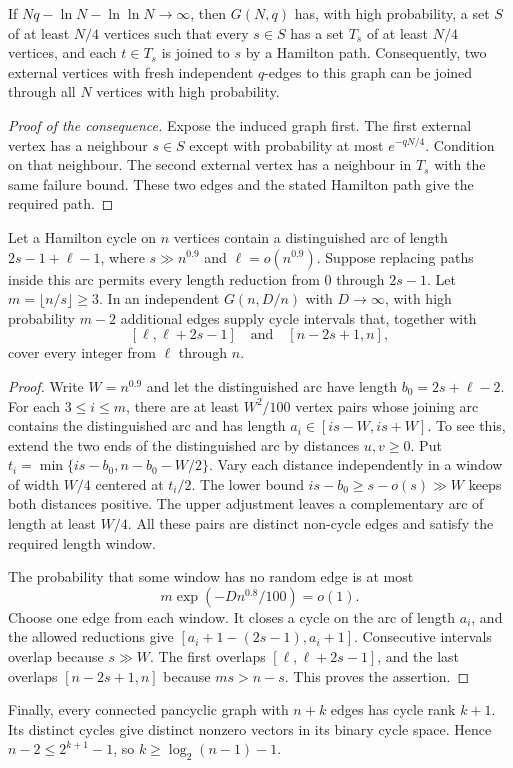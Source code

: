 \begin{lemma}\label{lem:rhost-threshold-hamilton}
If $Nq-\ln N-\ln\ln N\to\infty$, then $G(N,q)$ has, with high probability,
a set $S$ of at least $N/4$ vertices such that every $s\in S$ has a set $T_s$ of at least $N/4$ vertices,
and each $t\in T_s$ is joined to $s$ by a Hamilton path.
Consequently, two external vertices with fresh independent $q$-edges to this graph can be joined through all $N$ vertices with high probability.
\end{lemma}

\begin{proof}[Proof of the consequence]
Expose the induced graph first.
The first external vertex has a neighbour $s\in S$ except with probability at most $e^{-qN/4}$.
Condition on that neighbour.
The second external vertex has a neighbour in $T_s$ with the same failure bound.
These two edges and the stated Hamilton path give the required path.
\end{proof}

\begin{lemma}\label{lem:rhost-threshold-windows}
Let a Hamilton cycle on $n$ vertices contain a distinguished arc of length
$2s-1+\ell-1$, where $s\gg n^{0.9}$ and $\ell=o(n^{0.9})$.
Suppose replacing paths inside this arc permits every length reduction from $0$ through $2s-1$.
Let $m=\lfloor n/s\rfloor\ge3$.
In an independent $G(n,D/n)$ with $D\to\infty$, with high probability $m-2$ additional edges
supply cycle intervals that, together with
\[
 [\ell,\ell+2s-1]\quad\text{and}\quad[n-2s+1,n],
\]
cover every integer from $\ell$ through $n$.
\end{lemma}

\begin{proof}
Write $W=n^{0.9}$ and let the distinguished arc have length $b_0=2s+\ell-2$.
For each $3\le i\le m$, there are at least $W^2/100$ vertex pairs whose joining arc contains the distinguished arc
and has length $a_i\in[is-W,is+W]$.
To see this, extend the two ends of the distinguished arc by distances $u,v\ge0$.
Put $t_i=\min\{is-b_0,n-b_0-W/2\}$.
Vary each distance independently in a window of width $W/4$ centered at $t_i/2$.
The lower bound $is-b_0\ge s-o(s)\gg W$ keeps both distances positive.
The upper adjustment leaves a complementary arc of length at least $W/4$.
All these pairs are distinct non-cycle edges and satisfy the required length window.

The probability that some window has no random edge is at most
\[
 m\exp(-Dn^{0.8}/100)=o(1).
\]
Choose one edge from each window.
It closes a cycle on the arc of length $a_i$, and the allowed reductions give
$[a_i+1-(2s-1),a_i+1]$.
Consecutive intervals overlap because $s\gg W$.
The first overlaps $[\ell,\ell+2s-1]$, and the last overlaps $[n-2s+1,n]$ because $ms>n-s$.
This proves the assertion.
\end{proof}

Finally, every connected pancyclic graph with $n+k$ edges has cycle rank $k+1$.
Its distinct cycles give distinct nonzero vectors in its binary cycle space.
Hence $n-2\le2^{k+1}-1$, so $k\ge\log_2(n-1)-1$.

